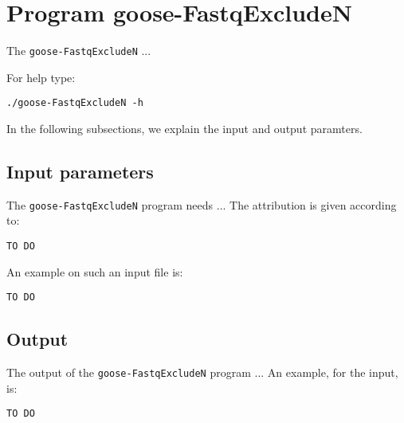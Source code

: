 \section{Program goose-FastqExcludeN}
The \texttt{goose-FastqExcludeN} ...

For help type:
\begin{lstlisting}
./goose-FastqExcludeN -h
\end{lstlisting}
In the following subsections, we explain the input and output paramters.

\subsection*{Input parameters}

The \texttt{goose-FastqExcludeN} program needs ...
The attribution is given according to:
\begin{lstlisting}
TO DO
\end{lstlisting}

An example on such an input file is:
\begin{lstlisting}
TO DO
\end{lstlisting}

\subsection*{Output}
The output of the \texttt{goose-FastqExcludeN} program ...
An example, for the input, is:
\begin{lstlisting}
TO DO
\end{lstlisting}
